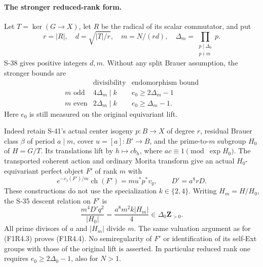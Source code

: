 \paragraph{The stronger reduced-rank form.}
Let $T=\ker(G\to X)$, let $R$ be the radical of its scalar
commutator, and put
\[
 r=|R|,\quad d=\sqrt{|T|/r},\quad m=N/(rd),\quad
 \Delta_m=\prod_{\substack{p\mid\Delta_0\\p\nmid m}}p.
\]
S-38 gives positive integers $d,m$. Without any split Brauer
assumption, the stronger bounds are
\[
 \begin{array}{c|c|c}
 &\text{divisibility}&\text{endomorphism bound}\\\hline
 m\text{ odd}&4\Delta_m\mid k&e_0\ge2\Delta_m-1\\
 m\text{ even}&2\Delta_m\mid k&e_0\ge\Delta_m-1.
 \end{array}
 \tag{F1R4.4}
\]
Here $e_0$ is still measured on the original equivariant lift.

Indeed retain S-41's actual center isogeny $p:B\to X$ of degree
$r$, residual Brauer class $\beta$ of period $a\mid m$, cover
$u=[a]:B'\to B$, and the prime-to-$m$ subgroup $H_0$ of
$H=G/T$. Its translations lift by $h\mapsto cb_h$, where
$ac\equiv1\pmod{\exp H_0}$. The transported coherent action
and ordinary Morita transform give an actual $H_0$-equivariant
perfect object $F'$ of rank $m$ with
\[
 e^{-c_1(F')/m}\operatorname{ch}(F')=m u^*p^*v_q,
 \qquad D'=a^8rD.
\]
These constructions do not use the specialization $k\in\{2,4\}$.
Writing $H_m=H/H_0$, the S-35 descent relation on $F'$ is
\[
 \frac{m^4D'q^2}{|H_0|}
   =\frac{a^8m^2 k|H_m|}{4}
       \in\Delta_0\mathbf Z_{>0}.
 \tag{F1R4.5}
\]
All prime divisors of $a$ and $|H_m|$ divide $m$.
The same valuation argument as for (F1R4.3) proves (F1R4.4).
No semiregularity of $F'$ or identification of its self-Ext
groups with those of the original lift is asserted. In particular
reduced rank one requires $e_0\ge2\Delta_0-1$, also for $N>1$.

